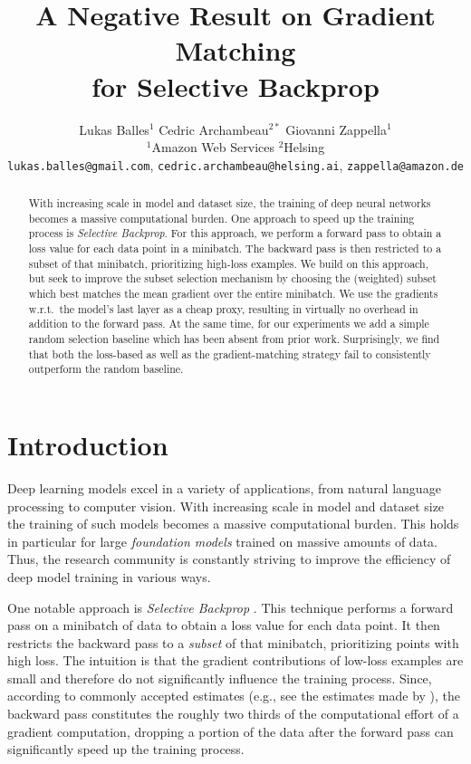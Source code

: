 \documentclass{article}
\title{A Negative Result on Gradient Matching\\ for Selective Backprop}
\author{%
Lukas Balles$^{1}$ \quad Cedric Archambeau$^{2*}$ \quad Giovanni Zappella$^1$ \\
$^1$Amazon Web Services \quad $^2$Helsing \\
\texttt{lukas.balles@gmail.com},
\texttt{cedric.archambeau@helsing.ai},
\texttt{zappella@amazon.de}
}
\theoremstyle{plain}
\theoremstyle{definition}
\theoremstyle{remark}
\begin{document}
\maketitle


\begin{abstract}
\let\thefootnote\relax{}
With increasing scale in model and dataset size, the training of deep neural networks becomes a massive computational burden.
One approach to speed up the training process is \emph{Selective Backprop}.
For this approach, we perform a forward pass to obtain a loss value for each data point in a minibatch.
The backward pass is then restricted to a subset of that minibatch, prioritizing high-loss examples.
We build on this approach, but seek to improve the subset selection mechanism by choosing the (weighted) subset which best matches the mean gradient over the entire minibatch.
We use the gradients w.r.t.~the model's last layer as a cheap proxy, resulting in virtually no overhead in addition to the forward pass.
At the same time, for our experiments we add a simple random selection baseline which has been absent from prior work.
Surprisingly, we find that both the loss-based as well as the gradient-matching strategy fail to consistently outperform the random baseline.
\end{abstract}


\section{Introduction}
\label{sec:intro}

Deep learning models excel in a variety of applications, from natural language processing to computer vision.
With increasing scale in model and dataset size the training of such models becomes a massive computational burden.
This holds in particular for large \emph{foundation models} trained on massive amounts of data.
Thus, the research community is constantly striving to improve the efficiency of deep model training in various ways.

One notable approach is \emph{Selective Backprop} \citep{jiang2019accelerating}.
This technique performs a forward pass on a minibatch of data to obtain a loss value for each data point.
It then restricts the backward pass to a \emph{subset} of that minibatch, prioritizing points with high loss.
The intuition is that the gradient contributions of low-loss examples are small and therefore do not significantly influence the training process.
Since, according to commonly accepted estimates (e.g., see the estimates made by \cite{deepspeed-back}), the backward pass constitutes the roughly two thirds of the computational effort of a gradient computation, dropping a portion of the data after the forward pass can significantly speed up the training process.
\end{document}
